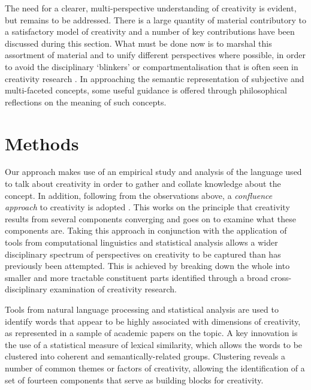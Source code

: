 \documentclass[10pt,letterpaper]{article}
\begin{document}
The need for a clearer, multi-perspective understanding of creativity is evident, but remains to be addressed. There is a large quantity of material contributory to a satisfactory model of creativity and a number of key contributions have been discussed during this section. What must be done now is to marshal this assortment of material and to unify different perspectives where possible, in order to avoid the disciplinary `blinkers' or compartmentalisation that is often seen in creativity research \cite{hennessey10}. In approaching the semantic representation of subjective and multi-faceted concepts, some useful guidance is offered through philosophical reflections on the meaning of such concepts. 




\section*{Methods}
\label{methodology}

Our approach makes use of an empirical study and analysis of the language used to talk about creativity in order to gather and collate knowledge about the concept. In addition, following from the observations above, a {\em  confluence approach\/} to creativity is adopted \cite{sternberg99a,mayer99,ivcevic09}. This works on the principle that creativity results from several components converging and goes on to examine what these components are. Taking this approach in conjunction with the application of tools from computational linguistics and statistical analysis allows a wider disciplinary spectrum of perspectives on creativity to be captured than has previously been attempted. This is achieved by breaking down the whole into smaller and more tractable constituent parts identified through a broad cross-disciplinary examination of creativity research.

Tools from natural language processing and statistical analysis are used to identify words that appear to be highly associated with dimensions of creativity, as represented in a sample of academic papers on the topic. A key innovation is the use of a statistical measure of lexical similarity, which allows the words to be clustered into coherent and semantically-related groups. Clustering reveals a number of common themes or factors of creativity, allowing the identification of a set of fourteen components that serve as building blocks for creativity.
\end{document}
